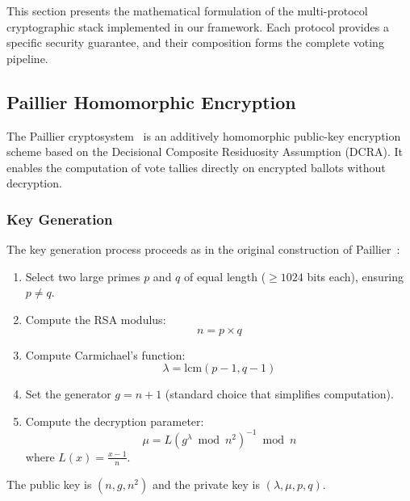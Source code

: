 This section presents the mathematical formulation of the multi-protocol cryptographic stack implemented in our framework. Each protocol provides a specific security guarantee, and their composition forms the complete voting pipeline.

\subsection{Paillier Homomorphic Encryption}
\label{subsec:paillier}

The Paillier cryptosystem~\cite{paillier1999} is an additively homomorphic public-key encryption scheme based on the Decisional Composite Residuosity Assumption (DCRA). It enables the computation of vote tallies directly on encrypted ballots without decryption.

\subsubsection{Key Generation}
\label{subsubsec:paillier-keygen}

The key generation process proceeds as in the original construction of Paillier~\cite{paillier1999}:

\begin{enumerate}
    \item Select two large primes $p$ and $q$ of equal length ($\geq 1024$ bits each), ensuring $p \neq q$.
    \item Compute the RSA modulus:
    \begin{equation}
        n = p \times q
        \label{eq:paillier-n}
    \end{equation}
    \item Compute Carmichael's function:
    \begin{equation}
        \lambda = \text{lcm}(p-1, q-1)
        \label{eq:paillier-lambda}
    \end{equation}
    \item Set the generator $g = n + 1$ (standard choice that simplifies computation).
    \item Compute the decryption parameter:
    \begin{equation}
        \mu = L(g^\lambda \bmod n^2)^{-1} \bmod n
        \label{eq:paillier-mu}
    \end{equation}
    where $L(x) = \frac{x-1}{n}$.
\end{enumerate}

The public key is $(n, g, n^2)$ and the private key is $(\lambda, \mu, p, q)$.

